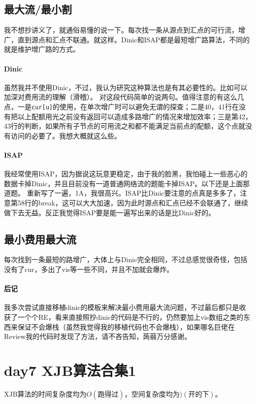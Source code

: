 \documentclass[]{cpp}
\begin{document}
\subsection{最大流/最小割} 我不想抄讲义了，就通俗易懂的说一下。每次找一条从源点到汇点的可行流，增广，直到源点和汇点不联通。就这样。Dinic和ISAP都是最短增广路算法，不同的就是维护增广路的方式。
\paragraph{Dinic} 虽然我并不使用Dinic，不过，我认为研究这种算法也是有其必要性的。比如可以加深对费用流的理解（滑稽）。
	对这段代码简单的说两句。值得注意的有这么几点，一是\verb|cur[u]|的使用，在单次增广时可以避免无谓的探查；二是40，41行在没有把以上配额用光之前没有返回可以造成多路增广的情况来增加效率；三是第42，43行的判断，如果所有子节点的可用流之和都不能满足当前点的配额，这个点就没有访问的必要了。我想大概就这么些。
\paragraph{ISAP} 我经常使用ISAP，因为据说这玩意更稳定，由于我的脸黑，我怕碰上一些恶心的数据卡掉Dinic，并且目前没有一道普通网络流的题能卡掉ISAP。以下还是上面那道题。
	重新写了一遍，1A，我很高兴。ISAP比Dinic要注意的点真是多多了，注意第58行的break，这可以大大加速，因为此时源点和汇点已经不会联通了，继续做下去无益。反正我觉得ISAP要是能一遍写出来的话是比Dinic好的。
\subsection{最小费用最大流} 每次找到一条最短的路增广，大体上与Dinic完全相同，不过总感觉很奇怪，包括没有了cur，多出了vis等一些不同，并且不加就会爆炸。
\paragraph{后记} 我多次尝试直接移植dinic的模板来解决最小费用最大流问题，不过最后都只是收获了一个个RE，看来直接照抄dinic的代码是不行的，仍然要加上vis数组之类的东西来保证不会爆栈（虽然我觉得我的移植代码也不会爆栈），如果哪名巨佬在Review我的代码时发现了方法，请不吝告知，蒟蒻万分感谢。
\section{day7 XJB算法合集1} XJB算法的时间复杂度均为$O(\mbox{跑得过})$，空间复杂度均为$)(\mbox{开的下})$。
\end{document}
